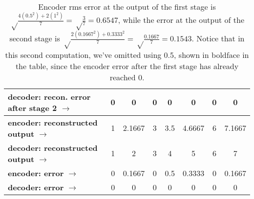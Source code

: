 \begin{table}[t]
\begin{tabular}{|l||c|c|c|c|c|c|c|}
\textbf{decoder: recon. error after stage 2} $\rightarrow$        & 0       & 0     & 0   & 0         &  0   &  0         & 0 \\\hline
\textbf{encoder: reconstructed output} $\rightarrow$             & 1         & 2.1667     & 3   & 3.5         &  4.6667   &  6         & 7.1667 \\\hline
\textbf{decoder: reconstructed output} $\rightarrow$             & 1         & 2     & 3   & 4         &  5   &  6         & 7 \\\hline
\textbf{encoder: error} $\rightarrow$                                   & 0       & 0.1667     & 0   & 0.5         &  0.3333   &  0         & 0.1667 \\\hline
\textbf{decoder: error} $\rightarrow$                                   & 0       & 0     & 0   & 0         &  0   &  0         & 0 \\\hline
\end{tabular}
\caption{Encoder rms error at the output of the first stage is {\color{blue}$\sqrt \frac{4(0.5^2) + 2(1^2)}{7} = \sqrt\frac{3}{7} = 0.6547$}, while the error at the output of the second stage is {\color{darkgreen}$\sqrt \frac{2(0.1667^2) + 0.3333^2}{7} = \sqrt\frac{0.1667}{7} = 0.1543$}.  Notice that in this second computation, we've omitted using 0.5, shown in boldface in the table, since the encoder error after the first stage has already reached 0.}
\label{table:detailed_computations}
\end{table}



\clearpage
\newpage
\appendix
